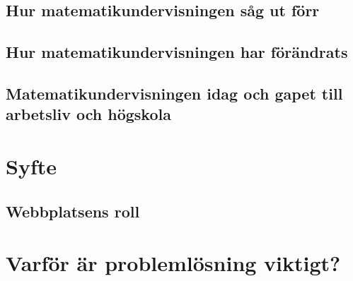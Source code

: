 \documentclass[11pt,a4paper]{article}
\begin{document}
    \subsection{Hur matematikundervisningen såg ut förr}
        \label{sec:MatteForr}
        
        
    \subsection{Hur matematikundervisningen har förändrats}
        \label{sec:Forandringar}
        
        
    \subsection{Matematikundervisningen idag och gapet till arbetsliv och högskola}
        
        \label{sec:matteidag}
        
%        

\section{Syfte}
    
    
    
    \subsection{Webbplatsens roll}
        
\section{Varför är problemlösning viktigt?}
    \label{sec:Teori}
    
        
\end{document}
